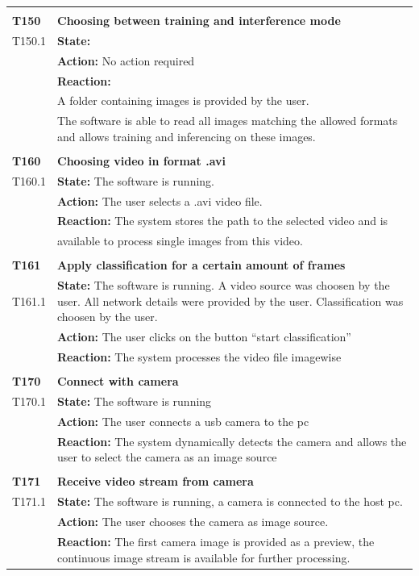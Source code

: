 \documentclass[parskip=full]{scrartcl}
\begin{document}
\begin{tabular}{p{2cm}p{12cm}}
& \\
\textbf{T150} & \textbf{Choosing between training and interference mode}\\
T150.1 & \textbf{State:} \\
& \textbf{Action:} No action required\\
& \textbf{Reaction:} \\
& A folder containing images is provided by the user.\\
& The software is able to read all images matching the allowed formats and allows training and inferencing on these images.\\

& \\
\textbf{T160} & \textbf{Choosing video in format .avi}\\
T160.1 & \textbf{State:} The software is running. \\
& \textbf{Action:} The user selects a .avi video file.\\
& \textbf{Reaction:} The system stores the path to the selected video and is \\
& available to process single images from this video.\\

& \\
\textbf{T161} & \textbf{Apply classification for a certain amount of frames}\\
T161.1 & \textbf{State:} The software is running. A video source was choosen by the user. All network details were provided by the user. Classification was choosen by the user.\\
& \textbf{Action:} The user clicks on the button ``start classification''\\
& \textbf{Reaction:} The system processes the video file imagewise\\

& \\
\textbf{T170} & \textbf{Connect with camera}\\
T170.1 & \textbf{State:} The software is running\\
& \textbf{Action:} The user connects a usb camera to the pc\\
& \textbf{Reaction:} The system dynamically detects the camera and allows the user to select the camera as an image source\\

& \\
\textbf{T171} & \textbf{Receive video stream from camera}\\
T171.1 & \textbf{State:} The software is running, a camera is connected to the host pc.\\
& \textbf{Action:} The user chooses the camera as image source.\\
& \textbf{Reaction:} The first camera image is provided as a preview, the continuous image stream is available for further processing.\\


\end{tabular}
\end{document}
